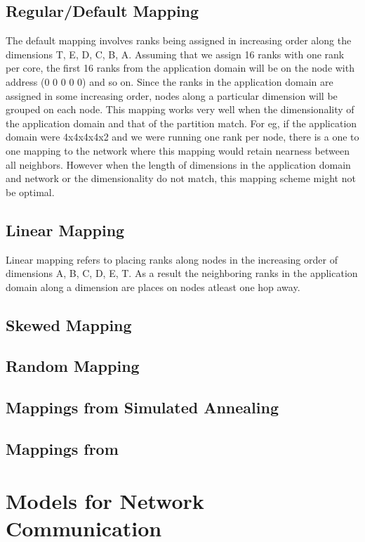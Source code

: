 \documentclass[conference,10pt]{IEEEtran}
\begin{document}
\subsection{Regular/Default Mapping}
The default mapping involves ranks being assigned in increasing order along the dimensions T, E, D, C, B, A.
Assuming that we assign 16 ranks with one rank per core, the first 16 ranks from the application domain will
be on the node with address (0 0 0 0 0) and so on. Since the ranks in the application domain are assigned in
some increasing order, nodes along a particular dimension will be grouped on each node. This mapping works
very well when the dimensionality of the application domain and that of the partition match. For eg, if the
application domain were 4x4x4x4x2 and we were running one rank per node, there is a one to one mapping to the
network where this mapping would retain nearness between all neighbors. However when the length of dimensions
in the application domain and network or the dimensionality do not match, this mapping scheme might not be
optimal.

\subsection{Linear Mapping}
Linear mapping refers to placing ranks along nodes in the increasing order of dimensions A, B, C, D, E, T.
As a result the neighboring ranks in the application domain along a dimension are places on nodes atleast
one hop away.

\subsection{Skewed Mapping}

\subsection{Random Mapping}
\subsection{Mappings from Simulated Annealing}
\subsection{Mappings from }



\section{Models for Network Communication}
\end{document}
